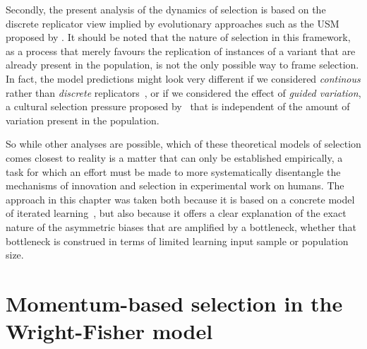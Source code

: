 Secondly, the present analysis of the dynamics of selection is based on the discrete replicator view implied by evolutionary approaches such as the USM proposed by \citet{Croft2000}.
It should be noted that the nature of selection in this framework, as a process that merely favours the replication of instances of a variant that are already present in the population, is not the only possible way to frame selection.
In fact, the model predictions might look very different if we considered \emph{continous} rather than \emph{discrete} replicators~\citep[e.g.][akin to the modelling of \emph{quantitative traits} in biological evolution]{Wedel2006}, or if we considered the effect of \emph{guided variation}, a cultural selection pressure proposed by~\citet[pp.136]{Boyd1985} that is independent of the amount of variation present in the population. 

So while other analyses are possible, which of these theoretical models of selection comes closest to reality is a matter that can only be established empirically, a task for which an effort must be made to more systematically disentangle the mechanisms of innovation and selection in experimental work on humans. %
The approach in this chapter was taken both because it is based on a concrete model of iterated learning~\citep{Reali2009}, but also because it offers a clear explanation of the exact nature of the asymmetric biases that are amplified by a bottleneck, whether that bottleneck is construed in terms of limited learning input sample or population size.

\section{Momentum-based selection in the Wright-Fisher model}\label{sec:asymmetricmomentum}

